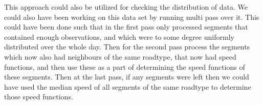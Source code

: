 This approach could also be utilized for checking the distribution of data. We could also have been working on this data set by running multi pass over it. This could have been done such that in the first pass only processed segments that contained enough observations, and which were to some degree uniformly distributed over the whole day. Then for the second pass process the segments which now also had neighbours of the same roadtype, that now had speed functions, and then use these as a part of determining the speed functions of these segments. Then at the last pass, if any segments were left then we could have used the median speed of all segments of the same roadtype to determine those speed functions.



